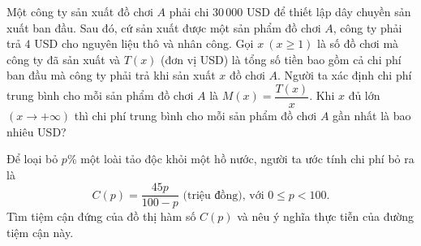 \begin{bt}%
	Một công ty sản xuất đồ chơi $A$ phải chi $30\,000$ USD để thiết lập dây chuyền sản xuất ban đầu. Sau đó, cứ sản xuất được một sản phẩm đồ chơi $A$, công ty phải trả $4$ USD cho nguyên liệu thô và nhân công. Gọi $x \ (x \geq 1)$ là số đồ chơi mà công ty đã sản xuất và $T(x)$ (đơn vị USD) là tổng số tiền bao gồm cả chi phí ban đầu mà công ty phải trả khi sản xuất $x$ đồ chơi $A$. Người ta xác định chi phí trung bình cho mỗi sản phẩm đồ chơi $A$ là $M(x) = \dfrac{T(x)}{x}$. Khi $x$ đủ lớn $(x \to +\infty)$ thì chi phí trung bình cho mỗi sản phẩm đồ chơi $A$ gần nhất là bao nhiêu USD?
\end{bt}

\begin{bt}%

	Để loại bỏ $p\%$ một loài tảo độc khỏi một hồ nước, người ta ước tính chi phí bỏ ra là
	$$
	C(p)=\dfrac{45p}{100-p} \text { (triệu đồng), với } 0 \leq p<100.
	$$
	Tìm tiệm cận đứng của đồ thị hàm số $C(p)$ và nêu ý nghĩa thực tiễn của đường tiệm cận này.
\end{bt}

